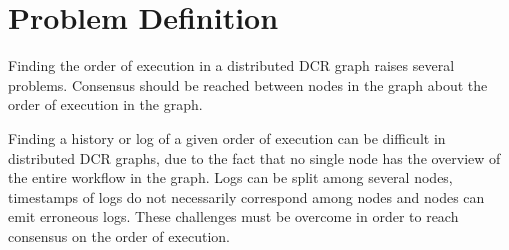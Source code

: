 \chapter{Problem Definition}

Finding the order of execution in a distributed DCR graph raises several problems.
Consensus should be reached between nodes in the graph about the order of execution in the graph.

Finding a history or log of a given order of execution can be difficult in distributed DCR graphs, due to the fact that no single node has the overview of the entire workflow in the graph.
Logs can be split among several nodes, timestamps of logs do not necessarily correspond among nodes and nodes can emit erroneous logs. These challenges must be overcome in order to reach consensus on the order of execution.
